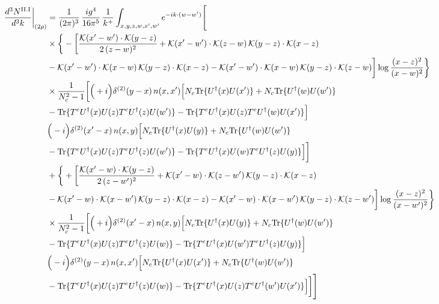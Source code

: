 \documentclass[9pt]{article}
\numberwithin{equation}{section}
\begin{document}
\begin{align}
\frac{d^{3}N^{\rm II.I}}{d^{3}k}\bigg|_{(2\rho)} &=\frac{1}{(2\pi)^{3}}\,\frac{ig^{4}}{16\pi^{5}}\,\frac{1}{k^{+}}\int_{x,y,z,w,x',w'}e^{-ik\cdot(w-w')}\Bigg[\notag\\
&\times\bigg\{-\bigg[\frac{\mathcal{K}(x'-w')\cdot\mathcal{K}(y-z)}{2\,(z-w)^{2}}+\mathcal{K}(x'-w')\cdot\mathcal{K}(z-w)\,\mathcal{K}(y-z)\cdot\mathcal{K}(x-z)\notag\\
&-\mathcal{K}(x'-w')\cdot\mathcal{K}(x-w)\,\mathcal{K}(y-z)\cdot\mathcal{K}(x-z)-\mathcal{K}(x'-w')\cdot\mathcal{K}(x-w)\,\mathcal{K}(y-z)\cdot\mathcal{K}(z-w)\bigg]\log\frac{(x-z)^{2}}{(x-w)^{2}}\bigg\}\notag\\
&\times \frac{1}{N_{c}^{2}-1}\bigg[\Big(+i\Big)\delta^{(2)}(y-x)\,n(x,x')\Big[N_{c}{\rm Tr}\{U^{\dagger}(x)U(x')\}+N_{c}{\rm Tr}\{U^{\dagger}(w)U(w')\}\notag\\
& -{\rm Tr}\{T^{e}U^{\dagger}(x)U(z)T^{e}U^{\dagger}(z)U(w')\}-{\rm Tr}\{T^{e}U^{\dagger}(x)U(z)T^{e}U^{\dagger}(w)U(x')\}\Big]\notag\\
& \Big(-i\Big)\delta^{(2)}(x'-x)\,n(x,y)\Big[N_{c}{\rm Tr}\{U^{\dagger}(x)U(y)\}+N_{c}{\rm Tr}\{U^{\dagger}(w)U(w')\}\notag\\
& -{\rm Tr}\{T^{e}U^{\dagger}(x)U(z)T^{e}U^{\dagger}(z)U(w')\}-{\rm Tr}\{T^{e}U^{\dagger}(x)U(w)T^{e}U^{\dagger}(z)U(y)\}\Big]\bigg]\notag\\
&+\bigg\{+\bigg[\frac{\mathcal{K}(x'-w)\cdot\mathcal{K}(y-z)}{2\,(z-w')^{2}}+\mathcal{K}(x'-w)\cdot\mathcal{K}(z-w')\,\mathcal{K}(y-z)\cdot\mathcal{K}(x-z)\notag\\
&-\mathcal{K}(x'-w)\cdot\mathcal{K}(x-w')\,\mathcal{K}(y-z)\cdot\mathcal{K}(x-z)-\mathcal{K}(x'-w)\cdot\mathcal{K}(x-w')\,\mathcal{K}(y-z)\cdot\mathcal{K}(z-w')\bigg]\log\frac{(x-z)^{2}}{(x-w')^{2}}\bigg\}\notag\\
&\times \frac{1}{N_{c}^{2}-1}\bigg[\Big(+i\Big)\delta^{(2)}(x'-x)\,n(x,y)\Big[N_{c}{\rm Tr}\{U^{\dagger}(x)U(y)\}+N_{c}{\rm Tr}\{U^{\dagger}(w)U(w')\}\notag\\
& -{\rm Tr}\{T^{e}U^{\dagger}(x)U(z)T^{e}U^{\dagger}(z)U(w)\}-{\rm Tr}\{T^{e}U^{\dagger}(x)U(w')T^{e}U^{\dagger}(z)U(y)\}\Big]\notag\\
& \Big(-i\Big)\delta^{(2)}(y-x)\,n(x,x')\Big[N_{c}{\rm Tr}\{U^{\dagger}(x)U(x')\}+N_{c}{\rm Tr}\{U^{\dagger}(w)U(w')\}\notag\\
& -{\rm Tr}\{T^{e}U^{\dagger}(x)U(z)T^{e}U^{\dagger}(z)U(w)\}-{\rm Tr}\{T^{e}U^{\dagger}(x)U(z)T^{e}U^{\dagger}(w')U(x')\}\Big]\bigg]\Bigg]\label{eq:E-II.I-2}
\end{align}
\end{document}
